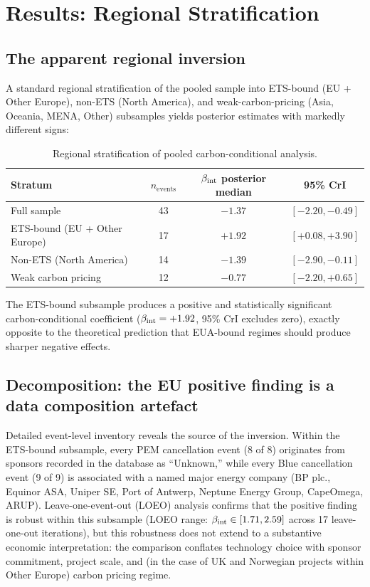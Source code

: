 \section{Results: Regional Stratification}
\label{sec:ch7-regional}
\label{sec:ch7-results-stratified}

\subsection{The apparent regional inversion}

A standard regional stratification of the pooled sample into ETS-bound (EU + Other Europe), non-ETS (North America), and weak-carbon-pricing (Asia, Oceania, MENA, Other) subsamples yields posterior estimates with markedly different signs:

\begin{table}[h!]
\centering
\caption{Regional stratification of pooled carbon-conditional analysis.}
\begin{tabular}{lccc}
\toprule
Stratum & $n_{\mathrm{events}}$ & $\beta_{\mathrm{int}}$ posterior median & 95\% CrI \\
\midrule
Full sample & 43 & $-1.37$ & $[-2.20, -0.49]$ \\
ETS-bound (EU + Other Europe) & 17 & $\mathbf{+1.92}$ & $\mathbf{[+0.08, +3.90]}$ \\
Non-ETS (North America) & 14 & $-1.39$ & $[-2.90, -0.11]$ \\
Weak carbon pricing & 12 & $-0.77$ & $[-2.20, +0.65]$ \\
\bottomrule
\end{tabular}
\label{tab:ch7-regional}
\end{table}

The ETS-bound subsample produces a positive and statistically significant carbon-conditional coefficient ($\beta_{\mathrm{int}} = +1.92$, 95\% CrI excludes zero), exactly opposite to the theoretical prediction that EUA-bound regimes should produce sharper negative effects.

\subsection{Decomposition: the EU positive finding is a data composition artefact}

Detailed event-level inventory reveals the source of the inversion. Within the ETS-bound subsample, every PEM cancellation event (8 of 8) originates from sponsors recorded in the database as ``Unknown,'' while every Blue cancellation event (9 of 9) is associated with a named major energy company (BP plc., Equinor ASA, Uniper SE, Port of Antwerp, Neptune Energy Group, CapeOmega, ARUP). Leave-one-event-out (LOEO) analysis confirms that the positive finding is robust within this subsample (LOEO range: $\beta_{\mathrm{int}} \in [1.71, 2.59]$ across 17 leave-one-out iterations), but this robustness does not extend to a substantive economic interpretation: the comparison conflates technology choice with sponsor commitment, project scale, and (in the case of UK and Norwegian projects within Other Europe) carbon pricing regime.

